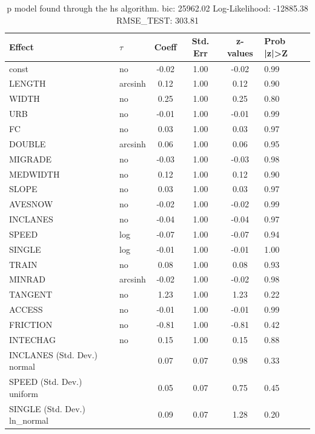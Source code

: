 \begin{table}
	\caption{p model found through the hs algorithm. bic: 25962.02 Log-Likelihood: -12885.38 RMSE_TEST: 303.81}
	\begin{center}
		\begin{tabular}{|l|l|c|c|c|l|}
			\hline
			Effect & $\tau$ & Coeff & Std. Err & z-values & Prob |z|>Z \\
			\hline
			const & no & -0.02 & 1.00 & -0.02 & 0.99 \\
			\hline
			LENGTH & arcsinh & 0.12 & 1.00 & 0.12 & 0.90 \\
			\hline
			WIDTH & no & 0.25 & 1.00 & 0.25 & 0.80 \\
			\hline
			URB & no & -0.01 & 1.00 & -0.01 & 0.99 \\
			\hline
			FC & no & 0.03 & 1.00 & 0.03 & 0.97 \\
			\hline
			DOUBLE & arcsinh & 0.06 & 1.00 & 0.06 & 0.95 \\
			\hline
			MIGRADE & no & -0.03 & 1.00 & -0.03 & 0.98 \\
			\hline
			MEDWIDTH & no & 0.12 & 1.00 & 0.12 & 0.90 \\
			\hline
			SLOPE & no & 0.03 & 1.00 & 0.03 & 0.97 \\
			\hline
			AVESNOW & no & -0.02 & 1.00 & -0.02 & 0.99 \\
			\hline
			INCLANES & no & -0.04 & 1.00 & -0.04 & 0.97 \\
			\hline
			SPEED & log & -0.07 & 1.00 & -0.07 & 0.94 \\
			\hline
			SINGLE & log & -0.01 & 1.00 & -0.01 & 1.00 \\
			\hline
			TRAIN & no & 0.08 & 1.00 & 0.08 & 0.93 \\
			\hline
			MINRAD & arcsinh & -0.02 & 1.00 & -0.02 & 0.98 \\
			\hline
			TANGENT & no & 1.23 & 1.00 & 1.23 & 0.22 \\
			\hline
			ACCESS & no & -0.01 & 1.00 & -0.01 & 0.99 \\
			\hline
			FRICTION & no & -0.81 & 1.00 & -0.81 & 0.42 \\
			\hline
			INTECHAG & no & 0.15 & 1.00 & 0.15 & 0.88 \\
			\hline
			INCLANES (Std. Dev.) normal &  & 0.07 & 0.07 & 0.98 & 0.33 \\
			\hline
			SPEED (Std. Dev.) uniform &  & 0.05 & 0.07 & 0.75 & 0.45 \\
			\hline
			SINGLE (Std. Dev.) ln_normal &  & 0.09 & 0.07 & 1.28 & 0.20 \\

\end{tabular}
\end{center}
\end{table}
